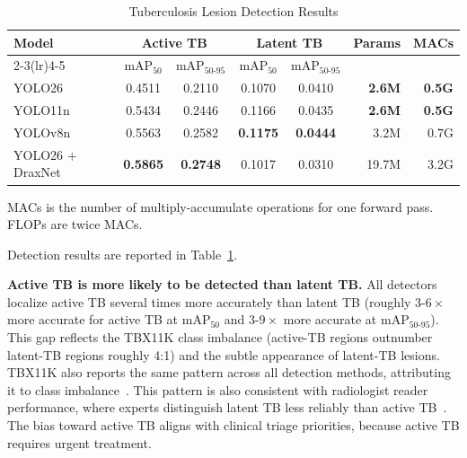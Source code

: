 \documentclass[conference, letterpaper]{IEEEtran}
\begin{document}
\begin{table}[!t]
\renewcommand{\arraystretch}{1.2}
\centering
\begin{threeparttable}
\caption{Tuberculosis Lesion Detection Results}
\label{tab:detection_results}
\small
\begin{tabular}{@{}l cc cc r r@{}}
\toprule
\multirow{2}{*}{\textbf{Model}} & \multicolumn{2}{c}{\textbf{Active TB}} & \multicolumn{2}{c}{\textbf{Latent TB}} & \multirow{2}{*}{\textbf{Params}} & \multirow{2}{*}{\textbf{MACs}} \\
\cmidrule(lr){2-3}\cmidrule(lr){4-5}
 & \textbf{$\mathrm{mAP}_{50}$} & \textbf{$\mathrm{mAP}_{50\text{-}95}$} & \textbf{$\mathrm{mAP}_{50}$} & \textbf{$\mathrm{mAP}_{50\text{-}95}$} & & \\
\midrule
YOLO26~\cite{yolo26} & 0.4511 & 0.2110 & 0.1070 & 0.0410 & \textbf{2.6M} & \textbf{0.5G} \\
YOLO11n~\cite{yolo11} & 0.5434 & 0.2446 & 0.1166 & 0.0435 & \textbf{2.6M} & \textbf{0.5G} \\
YOLOv8n~\cite{yolov8} & 0.5563 & 0.2582 & \textbf{0.1175} & \textbf{0.0444} & 3.2M & 0.7G \\
YOLO26 + DraxNet & \textbf{0.5865} & \textbf{0.2748} & 0.1017 & 0.0310 & 19.7M & 3.2G \\
\bottomrule
\end{tabular}
\begin{tablenotes}[flushleft]
\footnotesize
\item MACs is the number of multiply-accumulate operations for one forward pass. FLOPs are twice MACs.
\end{tablenotes}
\end{threeparttable}
\end{table}

Detection results are reported in Table~\ref{tab:detection_results}.

\textbf{Active TB is more likely to be detected than latent TB.}
All detectors localize active TB several times more accurately than latent TB (roughly $3\text{-}6\times$ more accurate for active TB at $\mathrm{mAP}_{50}$ and $3\text{-}9\times$ more accurate at $\mathrm{mAP}_{50\text{-}95}$). This gap reflects the TBX11K class imbalance (active-TB regions outnumber latent-TB regions roughly 4:1) and the subtle appearance of latent-TB lesions. TBX11K also reports the same pattern across all detection methods, attributing it to class imbalance~\cite{liu2023tbx11k_pami}. This pattern is also consistent with radiologist reader performance, where experts distinguish latent TB less reliably than active TB~\cite{choi2023tb_activity}. The bias toward active TB aligns with clinical triage priorities, because active TB requires urgent treatment.
\end{document}
